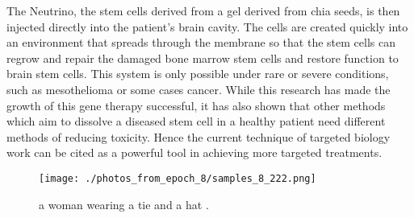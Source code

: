 \documentclass{article}%
\begin{document}
The Neutrino, the stem cells derived from a gel derived from chia seeds, is then injected directly into the patient's brain cavity. The cells are created quickly into an environment that spreads through the membrane so that the stem cells can regrow and repair the damaged bone marrow stem cells and restore function to brain stem cells. This system is only possible under rare or severe conditions, such as mesothelioma or some cases cancer. While this research has made the growth of this gene therapy successful, it has also shown that other methods which aim to dissolve a diseased stem cell in a healthy patient need different methods of reducing toxicity. Hence the current technique of targeted biology work can be cited as a powerful tool in achieving more targeted treatments.\newline%

%


\begin{figure}[h!]%
\centering%
\texttt{[image: ./photos\_from\_epoch\_8/samples\_8\_222.png]}%
\caption{a woman wearing a tie and a hat .}%
\end{figure}

%
\end{document}
